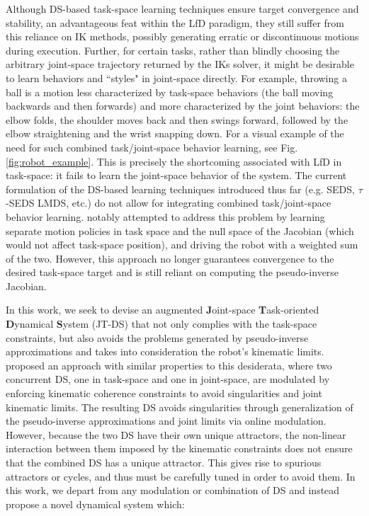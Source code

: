 \documentclass[letterpaper, 10 pt, conference,fleqn]{ieeeconf}
\begin{document}
Although DS-based task-space learning techniques ensure target convergence and stability, an advantageous feat within the LfD paradigm, they still suffer from this reliance on IK methods, possibly generating erratic or discontinuous motions during execution. Further, for certain tasks, rather than blindly choosing the arbitrary joint-space trajectory returned by the IKs solver, it might be desirable to learn behaviors and ``styles" in joint-space directly.  For example, throwing a ball is a motion less characterized by task-space behaviors (the ball moving backwards and then forwards) and more characterized by the joint behaviors: the elbow folds, the shoulder moves back and then swings forward, followed by the elbow straightening and the wrist snapping down. For a visual example of the need for such combined task/joint-space behavior learning, see Fig. \ref{fig:robot_example}. This is precisely the shortcoming associated with LfD in task-space: it fails to learn the joint-space behavior of the system. The current formulation of the DS-based learning techniques introduced thus far (e.g. SEDS, $\tau$-SEDS LMDS, etc.) do not allow for integrating combined task/joint-space behavior learning. \cite{calinon2008probabilistic} notably attempted to address this problem by learning separate motion policies in task space and the null space of the Jacobian (which would not affect task-space position), and driving the robot with a weighted sum of the two. However, this approach no longer guarantees convergence to the desired task-space target and is still reliant on computing the pseudo-inverse Jacobian. 


In this work, we seek to devise an augmented \textbf{J}oint-space \textbf{T}ask-oriented \textbf{D}ynamical \textbf{S}ystem (JT-DS) that not only complies with the task-space constraints, but also avoids the problems generated by pseudo-inverse approximations and takes into consideration the robot's kinematic limits. \cite{hersch2008reaching} proposed an approach with similar properties to this desiderata, where two concurrent DS, one in task-space and one in joint-space, are modulated by enforcing kinematic coherence constraints to avoid singularities and joint kinematic limits. The resulting DS avoids singularities through generalization of the pseudo-inverse approximations and joint limits via online modulation. However, because the two DS have their own unique attractors, the non-linear interaction between them imposed by the kinematic constraints does not ensure that the combined DS has a unique attractor. This gives rise to spurious attractors or cycles, and thus must be carefully tuned in order to avoid them. In this work, we depart from any modulation or combination of DS and instead propose a novel dynamical system which:
\end{document}

